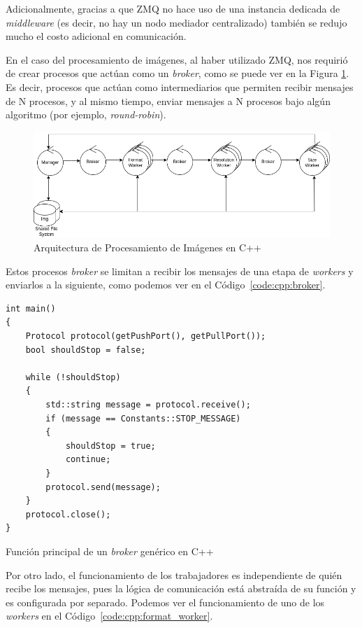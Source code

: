 \documentclass[11pt]{article}
\newcommand{\english}[1]{\textit{#1}}
\begin{document}
Adicionalmente, gracias a que ZMQ no hace uso de una instancia dedicada de \english{middleware} (es decir, no hay un nodo mediador centralizado) también se redujo mucho el costo adicional en comunicación.

En el caso del procesamiento de imágenes, al haber utilizado ZMQ, nos requirió de crear procesos que actúan como un \english{broker}, como se puede ver en la Figura \ref{fig:cpp:image_processing_arch}. Es decir, procesos que actúan como intermediarios que permiten recibir mensajes de N procesos, y al mismo tiempo, enviar mensajes a N procesos bajo algún algoritmo (por ejemplo, \english{round-robin}).

\begin{figure}[ht]
    \centering
    \includegraphics[scale=0.4]{resources/distributed_systems/cpp/image_processing_arch.png}
    \caption{Arquitectura de Procesamiento de Imágenes en C++}
    \label{fig:cpp:image_processing_arch}
\end{figure}

Estos procesos \english{broker} se limitan a recibir los mensajes de una etapa de \english{workers} y enviarlos a la siguiente, como podemos ver en el Código~\ref{code:cpp:broker}.

\begin{listing}[ht]
\begin{verbatim}
int main()
{
    Protocol protocol(getPushPort(), getPullPort());
    bool shouldStop = false;

    while (!shouldStop)
    {
        std::string message = protocol.receive();
        if (message == Constants::STOP_MESSAGE)
        {
            shouldStop = true;
            continue;
        }
        protocol.send(message);
    }
    protocol.close();
}
\end{verbatim}
\caption{Función principal de un \english{broker} genérico en C++}
\label{code:cpp:broker}
\end{listing}

Por otro lado, el funcionamiento de los trabajadores es independiente de quién recibe los mensajes, pues la lógica de comunicación está abstraída de su función y es configurada por separado. Podemos ver el funcionamiento de uno de los \english{workers} en el Código~\ref{code:cpp:format_worker}.
\end{document}
